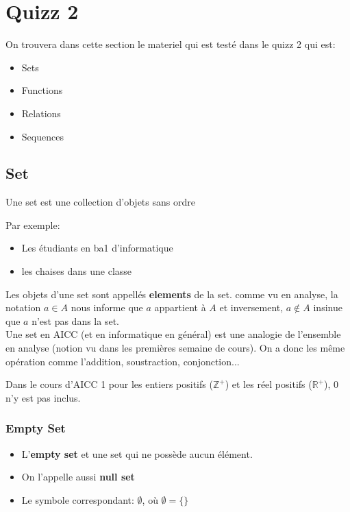 \chapter{Quizz 2}
On trouvera dans cette section le materiel qui est testé dans le quizz 2 qui est: 
\begin{itemize}
    \item Sets
    \item Functions
    \item Relations
    \item Sequences
\end{itemize}
\section{Set}

\begin{definition}[set]
    Une set est une collection d'objets sans ordre
\end{definition}
Par exemple:
\begin{itemize}
    \item Les étudiants en ba1 d'informatique
    \item les chaises dans une classe
\end{itemize}
Les objets d'une set sont appellés \textbf{elements} de la set. comme vu en analyse, la notation $a \in A$ nous informe que $a$ appartient à $A$ et inversement, $a \notin A$ insinue que $a$ n'est pas dans la set.
\\
Une set en AICC (et en informatique en général) est une analogie de l'ensemble en analyse (notion vu dans les premières semaine de cours). On a donc les même opération comme l'addition, soustraction, conjonction... 
\hspace{0.4cm}
\newpage

\begin{framedremark}
    Dans le cours d'AICC 1 pour les entiers positifs ($\mathbb{Z}^+$) et les réel positifs ($\mathbb{R}^+$), $0$ n'y est pas inclus.
\end{framedremark}

\subsection{Empty Set}
\begin{itemize}
    \item L'\textbf{empty set} et une set qui ne possède aucun élément.
    \item On l'appelle aussi \textbf{null set}
    \item Le symbole correspondant: $\emptyset$, où $\emptyset = \{\}$
\end{itemize}

